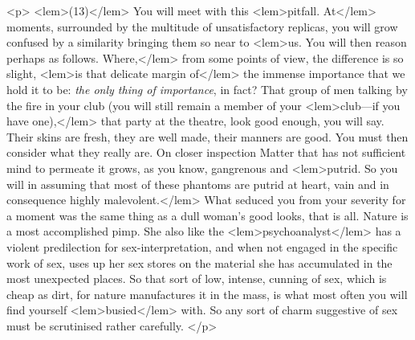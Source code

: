 {{				<p>
				\vspace{10pt}
				\noindent
<lem>(13)</lem>{}\hspace{20pt} You will meet with this 
<lem>pitfall. At</lem> 
				{}
				moments, surrounded by the multitude of 
				unsatisfactory replicas, you will grow confused by a similarity bringing them so near 
				to 
<lem>us. You will then reason perhaps as follows. Where,</lem> 
					{}
				from some points of view, the 
				difference is so slight, 
<lem>is that delicate margin of</lem> 
					{}
				the immense importance that we 
				hold it to be: \emph{the only thing of importance}, in fact? That group of men talking by 
				the fire in your club (you will still remain a member of your 
<lem>club---if you have one),</lem> 
					{}
				that party at 
				the theatre, look good enough, you will say. Their skins are fresh, they are well 
				made, their manners are good. You must then consider what they really are. On closer 
				inspection  
					{}
				Matter that has not sufficient mind to permeate it grows, as you know, 
				gangrenous and 
<lem>putrid. So you will  in assuming that most of these phantoms are 
				putrid at heart, vain and in consequence highly malevolent.</lem> 
					{}
				What seduced you from 
				your severity for a moment was the same thing as a dull woman's good looks, that is 
				all. Nature is a most accomplished pimp. She also like the 
<lem>psychoanalyst</lem>
					{} 
				has a 
				violent predilection for sex-interpretation, and when not engaged in the specific 
				work of sex, uses up her sex stores on the material she has accumulated in the 
				most unexpected places. So that sort of low, intense, cunning of sex, which is cheap 
				as dirt, for nature manufactures it in the mass, is what most often you will find 
				yourself 
<lem>busied</lem>
					{}
				with. So any sort of charm suggestive of sex must be scrutinised 
				rather carefully. 
				</p> 

}}
